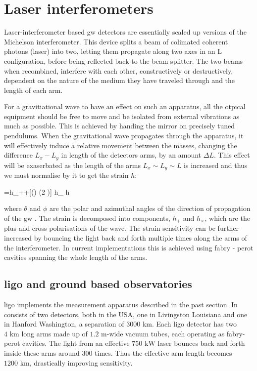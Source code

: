 \documentclass[
  10pt,
  a4paper,
  DIV=11,
  numbers=noendperiod,
  twoside]{scrreprt}
\let\[\relax \let\]\relax %
\DeclareRobustCommand{\[}{\begin{equation}}
\DeclareRobustCommand{\]}{\end{equation}}
\begin{document}
\hypertarget{laser-interferometers}{%
\section{Laser interferometers}\label{laser-interferometers}}

Laser-interferometer based \gls{gw} detectors are essentially scaled up
versions of the Michelson interferometer. This device splits a beam of
colimated coherent photons (laser) into two, letting them propagate
along two axes in an L configuration, before being reflected back to the
beam splitter. The two beams when recombined, interfere with each other,
constructively or destructively, dependent on the nature of the medium
they have traveled through and the length of each arm.

For a gravitiational wave to have an effect on such an apparatus, all
the otpical equipment should be free to move and be isolated from
external vibrations as much as possible. This is achieved by handing the
mirror on precisely tuned pendulums. When the gravitational wave
propagates through the apparatus, it will effectively induce a relative
movement between the masses, changing the difference \(L_x-L_y\) in
length of the detectors arms, by an amount \(\Delta L\). This effect
will be exaserbated as the length of the arms \(L_x \sim L_y \sim L\) is
increased and thus we must normalise by it to get the strain \(h\):

\[
= h_{+}+[\cos (\theta) \sin (2 \phi)] h_{\times} \equiv h
\]

where \(\theta\) and \(\phi\) are the polar and azimuthal angles of the
direction of propagation of the \gls{gw} . The strain is decomposed into
components, \(h_{+}\) and \(h_{\times}\), which are the plus and cross
polarisations of the wave. The strain sensitivity can be further
increased by bouncing the light back and forth multiple times along the
arms of the interferometer. In current implementations this is achieved
using fabry - perot cavities spanning the whole length of the arms.

\hypertarget{sec-ligo}{%
\subsection{\texorpdfstring{\gls{ligo} and ground based
observatories}{ and ground based observatories}}\label{sec-ligo}}

\gls{ligo} implements the measurement apparatus described in the past
section. In consists of two detectors, both in the USA, one in
Livingston Louisiana and one in Hanford Washington, a separation of
\(3000 \text{ km}\). Each \gls{ligo} detector has two \(4\text{ km}\)
long arms made up of \(1.2\text{ m}\)-wide vacuum tubes, each operating
as fabry-perot cavities. The light from an effective \(750\text{ kW}\)
laser bounces back and forth inside these arms around 300 times. Thus
the effective arm length becomes \(1200\text{ km}\), drastically
improving sensitivity.
\end{document}
